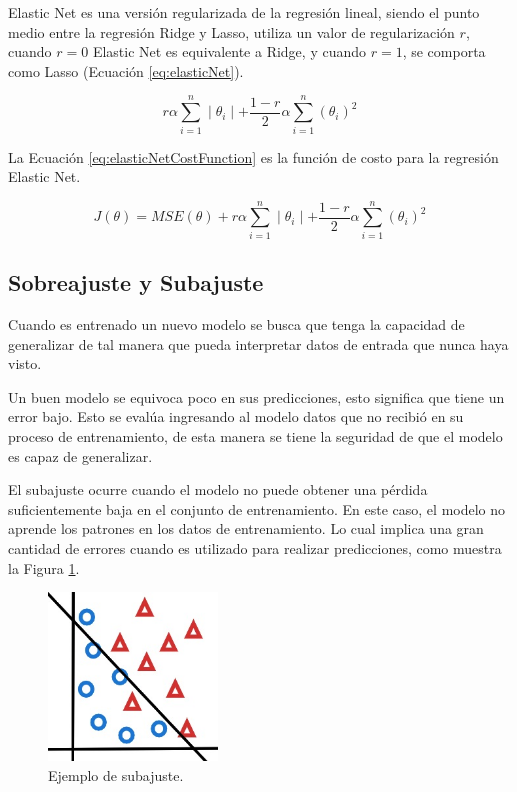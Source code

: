 Elastic Net es una versión regularizada de la regresión lineal, siendo el punto medio entre la regresión Ridge y Lasso, utiliza un valor de regularización $r$, cuando $r = 0$ Elastic Net es equivalente a Ridge, y cuando $r = 1$, se comporta como Lasso (Ecuación \ref{eq:elasticNet}).

\begin{equation}
    \label{eq:elasticNet}
    r \alpha \displaystyle\sum\limits_{i=1}^n  \mid \theta_i \mid
    + \frac{1 - r}{2} \alpha \displaystyle\sum\limits_{i=1}^n  (\theta_i)^{2}
\end{equation}

La Ecuación \ref{eq:elasticNetCostFunction} es la función de costo para la regresión Elastic Net.

\begin{equation}
    \label{eq:elasticNetCostFunction}
    J(\theta) = MSE(\theta)
    + r \alpha \displaystyle\sum\limits_{i=1}^n  \mid \theta_i \mid
    + \frac{1 - r}{2} \alpha \displaystyle\sum\limits_{i=1}^n  (\theta_i)^{2}
\end{equation}

\subsection{Sobreajuste y Subajuste}

Cuando es entrenado un nuevo modelo se busca que tenga la capacidad de generalizar de tal manera que pueda interpretar datos de entrada que nunca haya visto.

Un buen modelo se equivoca poco en sus predicciones, esto significa que tiene un error bajo. Esto se evalúa ingresando al modelo datos que no recibió en su proceso de entrenamiento, de esta manera se tiene la seguridad de que el modelo es capaz de generalizar.

El subajuste ocurre cuando el modelo no puede obtener una pérdida suficientemente baja en el conjunto de entrenamiento. En este caso, el modelo no aprende los patrones en los datos de entrenamiento. Lo cual implica una gran cantidad de errores cuando es utilizado para realizar predicciones, como muestra la Figura \ref{fig:OverFiting}.


\begin{figure}[H]
    \centering
    \includegraphics[width=0.4\textwidth]{MarcoTeorico/imgs/Ajuste_subajuste.jpg}
    \caption{Ejemplo de subajuste.}
    \label{fig:OverFiting}
\end{figure}


